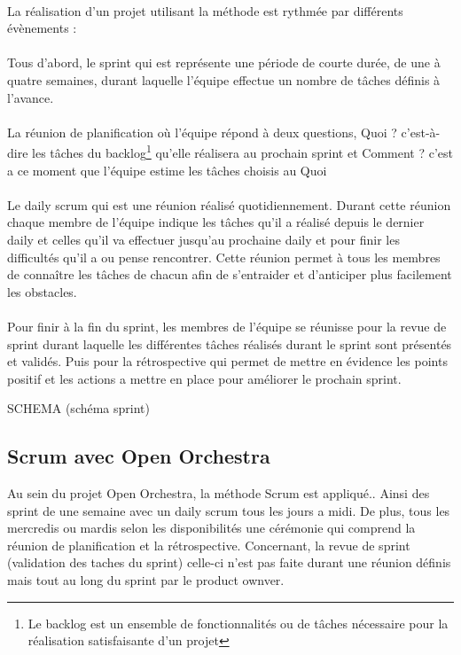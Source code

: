 \paragraph{}
La réalisation d'un projet utilisant la méthode est rythmée par différents évènements : 
\paragraph{}
Tous d'abord, le sprint qui est représente une période de courte durée, de une à quatre semaines, durant laquelle l'équipe effectue un nombre de tâches définis à l'avance.
 \paragraph{}
 La réunion de planification où l'équipe répond à deux questions, \og Quoi ? \fg{} c'est-à-dire les tâches du backlog\footnote{Le backlog est un ensemble de fonctionnalités ou de tâches nécessaire pour la réalisation satisfaisante d'un projet} qu'elle réalisera au prochain sprint et \og Comment ? \fg{} c'est a ce moment que l'équipe estime les tâches choisis au \og Quoi \fg{} 

 \paragraph{}
Le \og daily scrum \fg{} qui est une réunion réalisé quotidiennement. Durant cette réunion chaque membre de l'équipe indique les tâches qu'il a réalisé depuis le dernier daily et celles qu'il va effectuer jusqu'au prochaine daily et pour finir les difficultés qu'il a ou pense rencontrer.
Cette réunion permet à tous les membres de connaître les tâches de chacun afin de s'entraider et d'anticiper plus facilement les obstacles.
 \paragraph{}
Pour finir à la fin du sprint, les membres de l'équipe se réunisse pour la revue de sprint durant laquelle les différentes tâches réalisés durant le sprint sont présentés et validés. Puis pour la rétrospective qui permet de mettre en évidence les points positif et les actions a mettre en place pour améliorer le prochain sprint.

SCHEMA (schéma sprint)
\subsection{Scrum avec Open Orchestra}
Au sein du projet Open Orchestra, la méthode Scrum est appliqué.. Ainsi des sprint de une semaine avec un daily scrum tous les jours a midi.
De plus, tous les mercredis ou mardis selon les disponibilités une \og cérémonie \fg{} qui comprend la réunion de planification et la rétrospective.
Concernant, la revue de sprint (validation des taches du sprint) celle-ci n'est pas faite durant une réunion définis mais tout au long du sprint par le product ownver.

